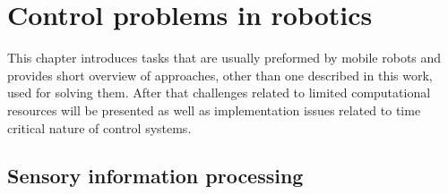 \FloatBarrier
\chapter{Control problems in robotics}
This chapter introduces tasks that are usually preformed by mobile robots and provides short 
overview of approaches, other than one described in this work, used for solving them.
After that challenges related to limited computational resources will be presented as well as 
implementation issues related to time critical nature of control systems.


\FloatBarrier
\section{Sensory information processing}

